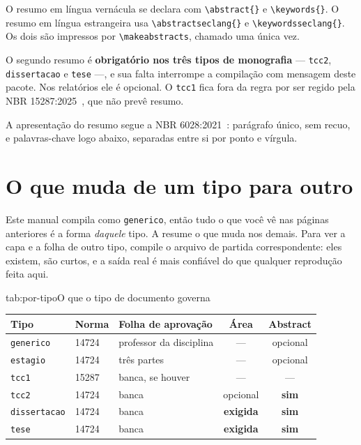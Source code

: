 O resumo em língua vernácula se declara com \verb|\abstract{}| e \verb|\keywords{}|. O resumo em
língua estrangeira usa \verb|\abstractseclang{}| e \verb|\keywordsseclang{}|. Os dois são impressos
por \verb|\makeabstracts|, chamado uma única vez.

O segundo resumo é \textbf{obrigatório nos três tipos de monografia} --- \texttt{tcc2},
\texttt{dissertacao} e \texttt{tese} ---, e sua falta interrompe a compilação com mensagem deste
pacote. Nos relatórios ele é opcional. O \texttt{tcc1} fica fora da regra por ser regido pela NBR
15287:2025~\cite{nbr15287:2025}, que não prevê resumo.

A apresentação do resumo segue a NBR 6028:2021~\cite{nbr6028:2021}: parágrafo único, sem recuo, e
palavras-chave logo abaixo, separadas entre si por ponto e vírgula.

\section{O que muda de um tipo para outro}\label{sec:o-que-muda}

Este manual compila como \texttt{generico}, então tudo o que você vê nas páginas anteriores é a
forma \emph{daquele} tipo. A  resume o que muda nos demais. Para ver a capa
e a folha de outro tipo, compile o arquivo de partida correspondente: eles existem, são curtos, e a
saída real é mais confiável do que qualquer reprodução feita aqui.

\begin{tabelaabnt}{tab:por-tipo}{O que o tipo de documento governa}
    \begin{tabular}{@{}lllcc@{}}
        \toprule
        \textbf{Tipo} & \textbf{Norma} & \textbf{Folha de aprovação} & \textbf{Área} &
        \textbf{Abstract}                                                                        \\
        \midrule
        \texttt{generico}    & 14724 & professor da disciplina & ---               & opcional     \\
        \texttt{estagio}     & 14724 & três partes            & ---               & opcional     \\
        \texttt{tcc1}        & 15287 & banca, se houver       & ---               & ---          \\
        \texttt{tcc2}        & 14724 & banca                  & opcional          & \textbf{sim} \\
        \texttt{dissertacao} & 14724 & banca                  & \textbf{exigida}  & \textbf{sim} \\
        \texttt{tese}        & 14724 & banca                  & \textbf{exigida}  & \textbf{sim} \\
        \bottomrule
    \end{tabular}
\end{tabelaabnt}

